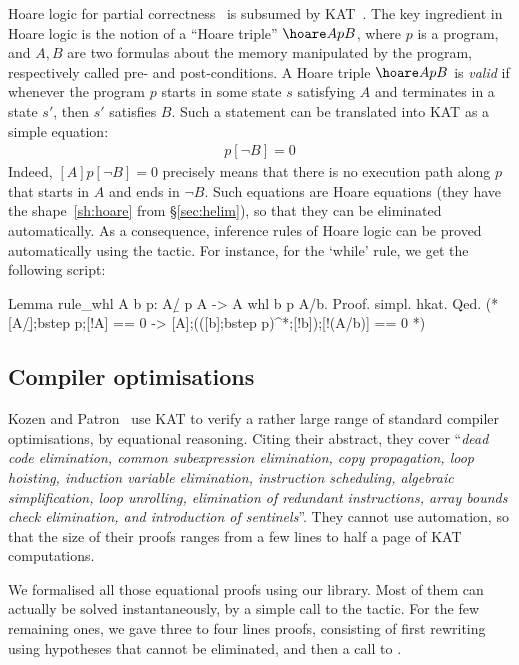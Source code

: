 \documentclass[a4paper]{llncs}
\begin{document}
Hoare logic for partial correctness~\cite{Hoare69} is subsumed by
KAT~\cite{kozen00:kat:hoare}. The key ingredient in Hoare logic is the notion of a ``Hoare triple''
$\hoare A p B$, where $p$ is a program, and $A,B$ are two formulas
about the memory manipulated by the program, respectively called pre-
and post-conditions. A Hoare triple $\hoare A p B$ is \emph{valid} if
whenever the program $p$ starts in some state $s$ satisfying $A$ and
terminates in a state $s'$, then $s'$ satisfies $B$. Such a statement
can be translated into KAT as a simple equation:
\begin{align*}
  [A]p[\neg B] = 0
\end{align*}
Indeed, $[A]p[\neg B]=0$ precisely means that there is no execution
path along $p$ that starts in $A$ and ends in $\neg B$.
Such equations are Hoare equations (they have the
shape~\eqref{sh:hoare} from §\ref{sec:helim}), so that they can be
eliminated automatically. As a consequence, inference rules of Hoare
logic can be proved automatically using the  tactic.
For instance, for the `while' rule, we get the following script:
\begin{coq}
Lemma rule_whl A b p: {A/\b} p {A} -> {A} whl b p {A/\!b}.
Proof. simpl. hkat. Qed.
(* [A/\b];bstep p;[!A] == 0 -> [A];(([b];bstep p)^*;[!b]);[!(A/\!b)] == 0 *)
\end{coq}


\subsection{Compiler optimisations}
\label{sec:compiler:opts}

Kozen and Patron~\cite{kozenp00:kat:compiler:opts} use KAT to verify a
rather large range of standard compiler optimisations, by equational
reasoning. Citing their abstract, they cover ``\emph{dead code
  elimination, common subexpression elimination, copy propagation,
  loop hoisting, induction variable elimination, instruction
  scheduling, algebraic simplification, loop unrolling, elimination of
  redundant instructions, array bounds check elimination, and
  introduction of sentinels}''. They cannot use automation, so that
the size of their proofs ranges from a few lines to half a page of KAT
computations.

We formalised all those equational proofs using our library. Most of
them can actually be solved instantaneously, by a simple call to the
 tactic.
For the few remaining ones, we gave three to four lines proofs,
consisting of first rewriting using hypotheses that cannot be
eliminated, and then a call to .
\end{document}
